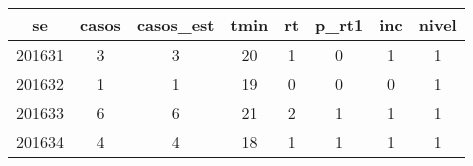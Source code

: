 \begin{tabular}{c|ccccccc}
  \hline
se & casos & casos\_est & tmin & rt & p\_rt1 & inc & nivel \\ 
  \hline
201631 & 3 & 3 & 20 & 1 & 0 & 1 & 1 \\ 
  201632 & 1 & 1 & 19 & 0 & 0 & 0 & 1 \\ 
  201633 & 6 & 6 & 21 & 2 & 1 & 1 & 1 \\ 
  201634 & 4 & 4 & 18 & 1 & 1 & 1 & 1 \\ 
   \hline
\end{tabular}
